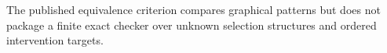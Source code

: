 The published equivalence criterion compares graphical patterns but does not package a finite exact checker over unknown selection structures and ordered intervention targets.